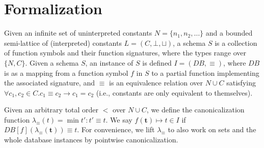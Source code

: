 \newpage
\section{Formalization}








\def\DB{\mathit{DB}}
\def\bmt{\textbf{t}}
\def\mergef{\mathit{merge}}

Given an infinite set of uninterpreted constants $N = \{n_1,n_2, \ldots\}$ 
 and a bounded semi-lattice of (interpreted) constants $L = (C, \bot, \sqcup)$,
 a schema $S$ is a collection of function symbols and their function signatures, 
 where the types range over $\{N, C\}$.
Given a schema $S$, an instance of $S$ is defined $I=(\DB, \equiv)$,
 where $\DB$ is as a mapping from a function symbol $f$ in $S$ 
 to a partial function implementing the associated signature, 
 and $\equiv$ is an equivalence relation over $N\cup C$ 
 satisfying $\forall c_1, c_2\in C. c_1\equiv c_2\rightarrow c_1=c_2$ (i.e., constants are only equivalent to themselves).

Given an arbitrary total order $<$ over $N\cup C$,
we define the canonicalization function $\lambda_{\equiv}(t)=\min t':t'\equiv t$.
We say $f(\bmt{})\mapsto t\in I$ if $\DB{}[f](\lambda_{\equiv}(\bmt{}){})\equiv t$.
For convenience, we lift $\lambda_{\equiv}$ to 
 also work on sets 
 and the whole database instances by pointwise canonicalization.

